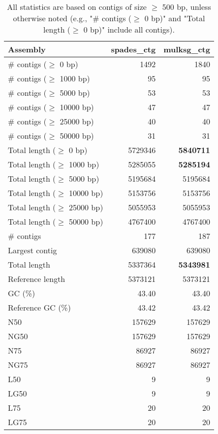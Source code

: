 \documentclass[12pt,a4paper]{article}
\begin{document}
\begin{table}[ht]
\begin{center}
\caption{All statistics are based on contigs of size $\geq$ 500 bp, unless otherwise noted (e.g., "\# contigs ($\geq$ 0 bp)" and "Total length ($\geq$ 0 bp)" include all contigs).}
\begin{tabular}{|l*{2}{|r}|}
\hline
Assembly & spades\_ctg & mulksg\_ctg \\ \hline
\# contigs ($\geq$ 0 bp) & 1492 & 1840 \\ \hline
\# contigs ($\geq$ 1000 bp) & 95 & 95 \\ \hline
\# contigs ($\geq$ 5000 bp) & 53 & 53 \\ \hline
\# contigs ($\geq$ 10000 bp) & 47 & 47 \\ \hline
\# contigs ($\geq$ 25000 bp) & 40 & 40 \\ \hline
\# contigs ($\geq$ 50000 bp) & 31 & 31 \\ \hline
Total length ($\geq$ 0 bp) & 5729346 & {\bf 5840711} \\ \hline
Total length ($\geq$ 1000 bp) & 5285055 & {\bf 5285194} \\ \hline
Total length ($\geq$ 5000 bp) & 5195684 & 5195684 \\ \hline
Total length ($\geq$ 10000 bp) & 5153756 & 5153756 \\ \hline
Total length ($\geq$ 25000 bp) & 5055953 & 5055953 \\ \hline
Total length ($\geq$ 50000 bp) & 4767400 & 4767400 \\ \hline
\# contigs & 177 & 187 \\ \hline
Largest contig & 639080 & 639080 \\ \hline
Total length & 5337364 & {\bf 5343981} \\ \hline
Reference length & 5373121 & 5373121 \\ \hline
GC (\%) & 43.40 & 43.40 \\ \hline
Reference GC (\%) & 43.42 & 43.42 \\ \hline
N50 & 157629 & 157629 \\ \hline
NG50 & 157629 & 157629 \\ \hline
N75 & 86927 & 86927 \\ \hline
NG75 & 86927 & 86927 \\ \hline
L50 & 9 & 9 \\ \hline
LG50 & 9 & 9 \\ \hline
L75 & 20 & 20 \\ \hline
LG75 & 20 & 20 \\ \hline

\end{tabular}
\end{center}
\end{table}
\end{document}
